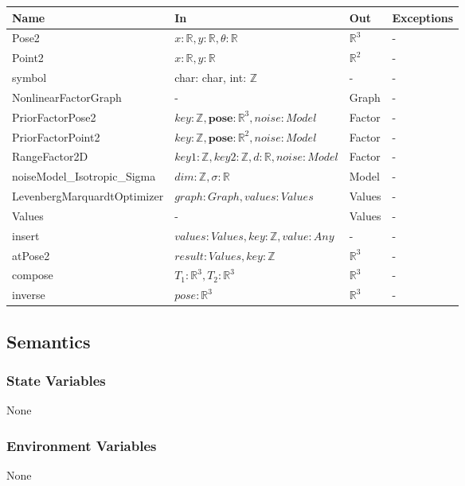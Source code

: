 \documentclass[12pt, titlepage]{article}
\begin{document}
\begin{center}
\begin{tabular}{p{6cm} p{6cm} p{2cm} p{3cm}}
\hline
\textbf{Name} & \textbf{In} & \textbf{Out} & \textbf{Exceptions} \\
\hline
Pose2 & $x: \mathbb{R}, y: \mathbb{R}, \theta: \mathbb{R}$ & $\mathbb{R}^{3}$ & - \\
Point2 & $x: \mathbb{R}, y: \mathbb{R}$  & $\mathbb{R}^{2}$  & - \\
symbol & char: char, int: $\mathbb{Z}$  & - & - \\
NonlinearFactorGraph & - & Graph & - \\
PriorFactorPose2 & $key:\mathbb{Z}, \textbf{pose}: \mathbb{R}^3, noise: Model$ & Factor & - \\
PriorFactorPoint2 & $key:\mathbb{Z}, \textbf{pose}: \mathbb{R}^2, noise: Model$& Factor& - \\
RangeFactor2D &  $key1: \mathbb{Z}, key2: \mathbb{Z}, d: \mathbb{R}, noise: Model$  & Factor & - \\
noiseModel\_Isotropic\_Sigma & $dim: \mathbb{Z}, \sigma: \mathbb{R}$ & Model & - \\
LevenbergMarquardtOptimizer & $graph: Graph, values: Values$ & Values & - \\
Values & - & Values & - \\
insert & $values: Values, key: \mathbb{Z}, value: Any$ & - & - \\
atPose2 & $result: Values, key: \mathbb{Z}$  & $\mathbb{R}^3$ & - \\
compose & $T_1: \mathbb{R}^3, T_2: \mathbb{R}^3$ & $\mathbb{R}^3$ & - \\
inverse &  $pose: \mathbb{R}^3$ & $\mathbb{R}^3$ & - \\
\hline
\end{tabular}
\end{center}

\subsection{Semantics}

\subsubsection{State Variables}
None

\subsubsection{Environment Variables}
None
\end{document}

